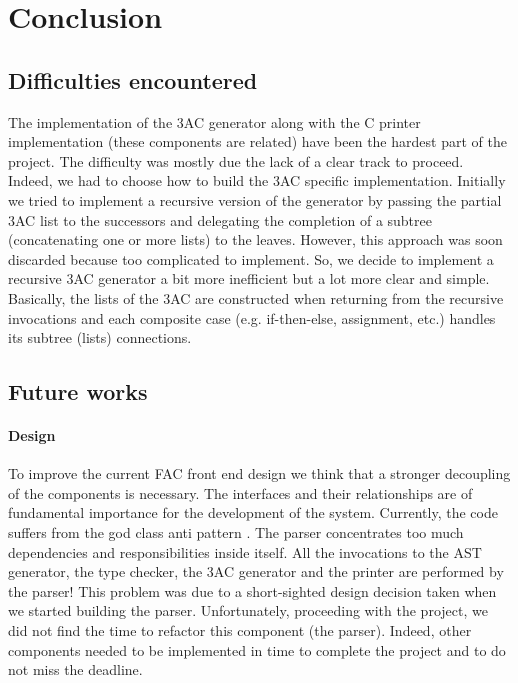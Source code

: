 \section{Conclusion}
\subsection{Difficulties encountered}
The implementation of the 3AC generator along with the C printer implementation 
(these components are related) have been the hardest part of the project. The 
difficulty was mostly due the lack of a clear track to proceed. Indeed, we
had to choose how to build the 3AC specific implementation. Initially we tried
to implement a recursive version of the generator by passing the partial 3AC 
list to the successors and delegating the completion of a subtree 
(concatenating one or more lists) to the leaves. However, this approach was soon 
discarded because too complicated to implement. So, we decide to implement a 
recursive 3AC generator a bit more inefficient but a lot more clear and simple. 
Basically, the lists of the 3AC are constructed when returning from the 
recursive invocations and each composite case (e.g. if-then-else, assignment, 
etc.) handles its subtree (lists) connections.
\subsection{Future works}
\paragraph{Design}
To improve the current FAC front end design we think that a stronger decoupling 
of the components is necessary. The interfaces and their relationships are of 
fundamental importance for the development of the system. Currently, the code 
suffers from the god class anti pattern \cite{Martin:2008:CCH:1388398}. 
The parser concentrates too much dependencies and responsibilities inside 
itself. All the invocations to the AST generator, the type checker, the 3AC 
generator and the printer are performed by the parser! This problem was due to a
short-sighted design decision taken when we started building the parser. 
Unfortunately, proceeding with the project, we did not find the time to refactor 
this component (the parser). Indeed, other components needed to be implemented 
in time to complete the project and to do not miss the deadline.

